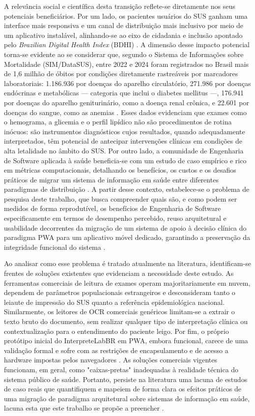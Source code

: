 \documentclass[12pt]{article}
\begin{document}
A relevância social e científica desta transição reflete-se diretamente nos seus potenciais beneficiários. Por um lado, os pacientes usuários do SUS ganham uma interface mais responsiva e um canal de distribuição mais inclusivo por meio de um aplicativo instalável, alinhando-se ao eixo de cidadania e inclusão apontado pelo \emph{Brazilian Digital Health Index} (BDHI) \cite{cruz2022}. A dimensão desse impacto potencial torna-se evidente ao se considerar que, segundo o Sistema de Informações sobre Mortalidade (SIM/DataSUS), entre 2022 e 2024 foram registrados no Brasil mais de 1,6 milhão de óbitos por condições diretamente rastreáveis por marcadores laboratoriais: 1.186.936 por doenças do aparelho circulatório, 271.986 por doenças endócrinas e metabólicas --- categoria que inclui o diabetes mellitus ---, 176.941 por doenças do aparelho geniturinário, como a doença renal crônica, e 22.601 por doenças do sangue, como as anemias \cite{brasil2025sim}. Esses dados evidenciam que exames como o hemograma, a glicemia e o perfil lipídico não são procedimentos de rotina inócuos: são instrumentos diagnósticos cujos resultados, quando adequadamente interpretados, têm potencial de antecipar intervenções clínicas em condições de alta letalidade no âmbito do SUS. Por outro lado, a comunidade de Engenharia de Software aplicada à saúde beneficia-se com um estudo de caso empírico e rico em métricas computacionais, detalhando os benefícios, os custos e os desafios práticos de migrar um sistema de informação em saúde entre diferentes paradigmas de distribuição \cite{oliveira2023}. A partir desse contexto, estabelece-se o problema de pesquisa deste trabalho, que busca compreender quais são, e como podem ser medidos de forma reprodutível, os benefícios de Engenharia de Software especificamente em termos de desempenho percebido, reuso arquitetural e usabilidade decorrentes da migração de um sistema de apoio à decisão clínica do paradigma PWA para um aplicativo móvel dedicado, garantindo a preservação da integridade funcional do sistema \cite{rampinelli2026}.

Ao analisar como esse problema é tratado atualmente na literatura, identificam-se frentes de soluções existentes que evidenciam a necessidade deste estudo. As ferramentas comerciais de leitura de exames operam majoritariamente em nuvem, dependem de parâmetros populacionais estrangeiros e desconsideram tanto o leiaute de impressão do SUS quanto a referência epidemiológica nacional. Similarmente, os leitores de OCR comerciais genéricos limitam-se a extrair o texto bruto do documento, sem realizar qualquer tipo de interpretação clínica ou contextualização para o entendimento do paciente leigo. Por fim, o próprio protótipo inicial do InterpreteLabBR em PWA, embora funcional, carece de uma validação formal e sofre com as restrições de encapsulamento e de acesso a hardware impostas pelos navegadores \cite{cardieri2018}. As soluções comerciais vigentes funcionam, em geral, como "caixas-pretas" inadequadas à realidade técnica do sistema público de saúde. Portanto, persiste na literatura uma lacuna de estudos de caso reais que quantifiquem e mapeiem de forma clara os efeitos práticos de uma migração de paradigma arquitetural sobre sistemas de informação em saúde, lacuna esta que este trabalho se propõe a preencher \cite{rampinelli2026}.
\end{document}
